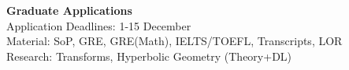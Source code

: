 \noindent \textbf{\Huge Graduate Applications}\\[0.3cm]

\noindent Application Deadlines: 1-15 December\\
\noindent Material: SoP, GRE, GRE(Math), IELTS/TOEFL, Transcripts, LOR\\
\noindent Research: Transforms, Hyperbolic Geometry (Theory+DL)
